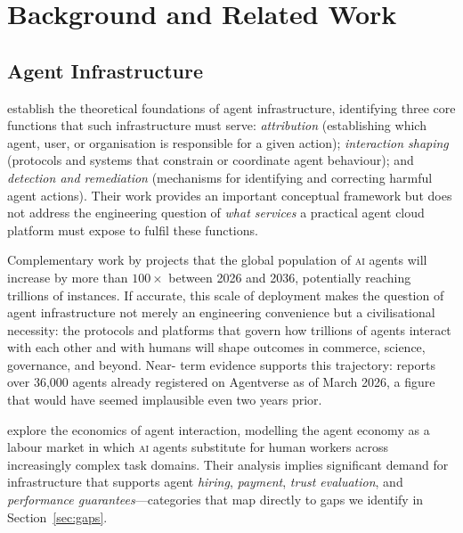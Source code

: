 \documentclass[twoside,11pt]{article}
\begin{document}
\section{Background and Related Work}
\label{sec:background}

\subsection{Agent Infrastructure}
\label{subsec:agent-infra}

\citet{chan2025infrastructure} establish the theoretical foundations of
agent infrastructure, identifying three core functions that such
infrastructure must serve: \emph{attribution} (establishing which agent, user,
or organisation is responsible for a given action); \emph{interaction shaping}
(protocols and systems that constrain or coordinate agent behaviour); and
\emph{detection and remediation} (mechanisms for identifying and correcting
harmful agent actions).  Their work provides an important conceptual framework
but does not address the engineering question of \emph{what services} a
practical agent cloud platform must expose to fulfil these functions.

Complementary work by \citet{hussein2025forecast} projects that the global
population of \textsc{ai} agents will increase by more than $100\times$ between
2026 and 2036, potentially reaching trillions of instances.  If accurate, this
scale of deployment makes the question of agent infrastructure not merely an
engineering convenience but a civilisational necessity: the protocols and
platforms that govern how trillions of agents interact with each other and with
humans will shape outcomes in commerce, science, governance, and beyond.  Near-
term evidence supports this trajectory: \citet{kantor2026stateofagents} reports
over 36,000 agents already registered on Agentverse as of March 2026, a figure
that would have seemed implausible even two years prior.

\citet{hadfield2025agenteconomy} explore the economics of agent interaction,
modelling the agent economy as a labour market in which \textsc{ai} agents
substitute for human workers across increasingly complex task domains.  Their
analysis implies significant demand for infrastructure that supports agent
\emph{hiring}, \emph{payment}, \emph{trust evaluation}, and \emph{performance
guarantees}---categories that map directly to gaps we identify in
Section~\ref{sec:gaps}.
\end{document}
